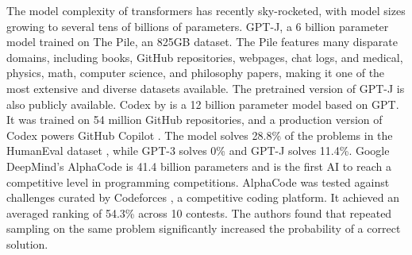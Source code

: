 The model complexity of transformers has recently sky-rocketed, with model sizes growing to several tens of billions of parameters. GPT-J, a 6 billion parameter model trained on The Pile, an 825GB dataset. The Pile features many disparate domains, including books, GitHub repositories, webpages, chat logs, and medical, physics, math, computer science, and philosophy papers, making it one of the most extensive and diverse datasets available. The pretrained version of GPT-J is also publicly available. Codex by \textcite{chen2021codex} is a 12 billion parameter model based on GPT. It was trained on 54 million GitHub repositories, and a production version of Codex powers GitHub Copilot . The model solves 28.8\% of the problems in the HumanEval dataset , while GPT-3 solves 0\% and GPT-J solves 11.4\%. Google DeepMind's AlphaCode is 41.4 billion parameters and is the first AI to reach a competitive level in programming competitions. AlphaCode was tested against challenges curated by Codeforces , a competitive coding platform. It achieved an averaged ranking of 54.3\% across 10 contests. The authors found that repeated sampling on the same problem significantly increased the probability of a correct solution.



\newcommand*\emptycirc[1][1ex]{\tikz\draw (0,0) circle (#1);} 
\newcommand*\halfcirc[1][1ex]{%
  \begin{tikzpicture}
  \draw[fill] (0,0)-- (90:#1) arc (90:270:#1) -- cycle ;
  \draw (0,0) circle (#1);
  \end{tikzpicture}}
\newcommand*\fullcirc[1][1ex]{\tikz\fill (0,0) circle (#1);} 



